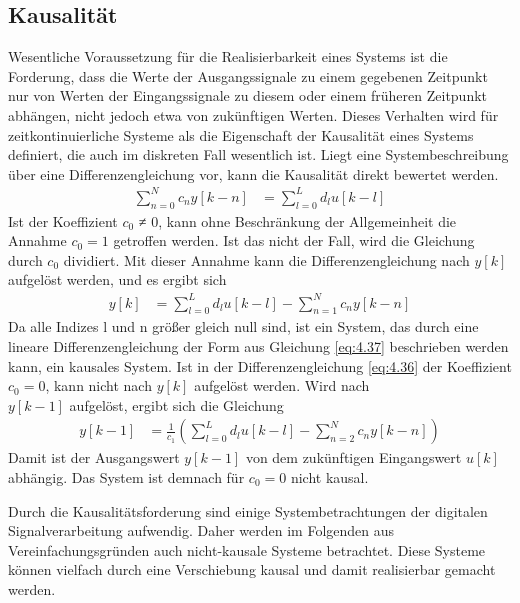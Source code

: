 \subsection{Kausalität}\label{sec:kausalituxe4t}

Wesentliche Voraussetzung für die Realisierbarkeit eines Systems ist die Forderung, dass die Werte der Ausgangssignale zu einem gegebenen Zeitpunkt nur von Werten der Eingangssignale zu diesem oder einem früheren Zeitpunkt abhängen, nicht jedoch etwa von zukünftigen Werten. Dieses Verhalten wird für zeitkontinuierliche Systeme als die Eigenschaft der Kausalität eines Systems definiert, die auch im diskreten Fall wesentlich ist. Liegt eine Systembeschreibung über eine Differenzengleichung vor, kann die Kausalität direkt bewertet werden.
\begin{align}
\sum\limits_{n = 0}^{N}{c_{n}  y[ k - n]} &= \sum\limits_{l = 0}^{L}{d_{l}  u[ k - l]} \label{eq:4.36}
\end{align}
Ist der Koeffizient \(c_{0}\) ≠ 0, kann ohne Beschränkung der Allgemeinheit die Annahme \(c_{0} = 1\) getroffen werden. Ist das nicht der Fall, wird die Gleichung durch \(c_{0}\) dividiert. Mit dieser Annahme kann die Differenzengleichung nach \(y[k]\) aufgelöst werden, und es ergibt sich
\begin{align}
y[ k] &= \sum\limits_{l = 0}^{L}{d_{l}  u[ k - l]} - \sum\limits_{n = 1}^{N}{c_{n}  y[ k - n]} \label{eq:4.37}
\end{align}
Da alle Indizes l und n größer gleich null sind, ist ein System, das durch eine lineare Differenzengleichung der Form aus Gleichung \eqref{eq:4.37} beschrieben werden kann, ein kausales System. Ist in der Differenzengleichung \eqref{eq:4.36} der Koeffizient \(c_{0} = 0\), kann nicht nach \(y[k]\) aufgelöst werden. Wird nach\\
\(y[k - 1]\) aufgelöst, ergibt sich die Gleichung
\begin{align}
y[ k - 1] &= \frac{1}{c_{1}}  \left( \sum\limits_{l = 0}^{L}{d_{l}  u[ k - l]} - \sum\limits_{n = 2}^{N}{c_{n}  y[ k - n]} \right) \label{eq:4.38}
\end{align}
Damit ist der Ausgangswert \(y[k - 1]\) von dem zukünftigen Eingangswert \(u[k]\) abhängig. Das System ist demnach für \(c_{0} = 0\) nicht kausal.

Durch die Kausalitätsforderung sind einige Systembetrachtungen der digitalen Signalverarbeitung aufwendig. Daher werden im Folgenden aus Vereinfachungsgründen auch nicht-kausale Systeme betrachtet. Diese Systeme können vielfach durch eine Verschiebung kausal und damit realisierbar gemacht werden.


